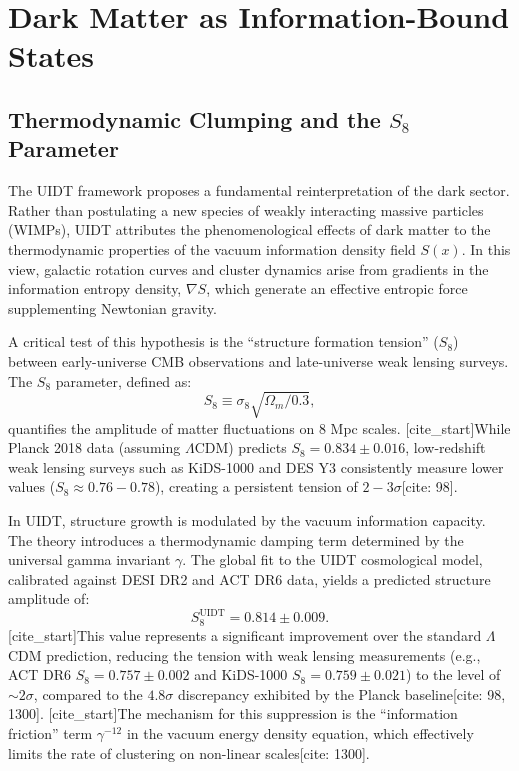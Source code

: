 
\section{Dark Matter as Information-Bound States}
\label{sec:darkmatter}

\subsection{Thermodynamic Clumping and the $S_8$ Parameter}
\label{subsec:s8_tension}

The UIDT framework proposes a fundamental reinterpretation of the dark sector. Rather than postulating a new species of weakly interacting massive particles (WIMPs), UIDT attributes the phenomenological effects of dark matter to the thermodynamic properties of the vacuum information density field $S(x)$. In this view, galactic rotation curves and cluster dynamics arise from gradients in the information entropy density, $\nabla S$, which generate an effective entropic force supplementing Newtonian gravity.

A critical test of this hypothesis is the ``structure formation tension'' ($S_8$) between early-universe CMB observations and late-universe weak lensing surveys. The $S_8$ parameter, defined as:
\begin{equation}
\label{eq:s8_definition}
S_8 \equiv \sigma_8 \sqrt{\Omega_m/0.3},
\end{equation}
quantifies the amplitude of matter fluctuations on 8 Mpc scales. [cite_start]While Planck 2018 data (assuming $\Lambda$CDM) predicts $S_8 = 0.834 \pm 0.016$, low-redshift weak lensing surveys such as KiDS-1000 and DES Y3 consistently measure lower values ($S_8 \approx 0.76-0.78$), creating a persistent tension of $2-3\sigma$[cite: 98].

In UIDT, structure growth is modulated by the vacuum information capacity. The theory introduces a thermodynamic damping term determined by the universal gamma invariant $\gamma$. The global fit to the UIDT cosmological model, calibrated against DESI DR2 and ACT DR6 data, yields a predicted structure amplitude of:
\begin{equation}
\label{eq:s8_prediction}
S_8^{\mathrm{UIDT}} = 0.814 \pm 0.009.
\end{equation}
[cite_start]This value represents a significant improvement over the standard $\Lambda$CDM prediction, reducing the tension with weak lensing measurements (e.g., ACT DR6 $S_8 = 0.757 \pm 0.002$ and KiDS-1000 $S_8 = 0.759 \pm 0.021$) to the level of $\sim 2\sigma$, compared to the $4.8\sigma$ discrepancy exhibited by the Planck baseline[cite: 98, 1300]. [cite_start]The mechanism for this suppression is the ``information friction'' term $\gamma^{-12}$ in the vacuum energy density equation, which effectively limits the rate of clustering on non-linear scales[cite: 1300].

